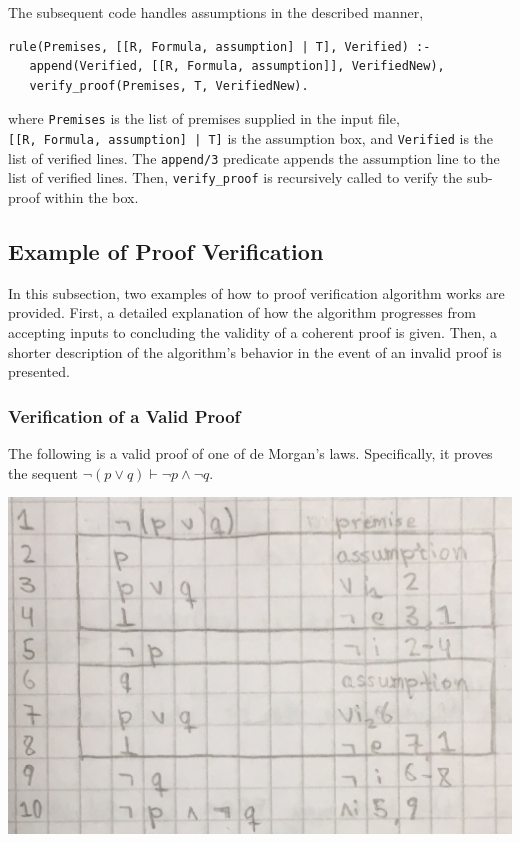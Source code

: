 \documentclass[a4paper, 11pt]{article}
\begin{document}
   The subsequent code handles assumptions in the described
   manner,

\begin{verbatim}
rule(Premises, [[R, Formula, assumption] | T], Verified) :-
   append(Verified, [[R, Formula, assumption]], VerifiedNew),
   verify_proof(Premises, T, VerifiedNew).
\end{verbatim}
   
   where \texttt{Premises} is the list of premises supplied 
   in the input file, \\ 
   \texttt{[[R, Formula, assumption] | T]} is the assumption
   box, and \texttt{Verified} is the list of verified lines.
   The \texttt{append/3} predicate appends the assumption line
   to the list of verified lines. Then, \texttt{verify\_proof}
   is recursively called to verify the sub-proof within the
   box.

   \subsection{Example of Proof Verification}

   In this subsection, two examples of how to proof
   verification algorithm works are provided. First, a
   detailed explanation of how the algorithm progresses from
   accepting inputs to concluding the validity of a coherent 
   proof is given. Then, a shorter description of the 
   algorithm's behavior in the event of an invalid proof is 
   presented.
   
   \subsubsection{Verification of a Valid Proof}

   The following is a valid proof of one of de Morgan's laws.
   Specifically, it proves the sequent 
   $\neg(p \vee q) \vdash \neg p \wedge \neg q$.
   \bigbreak

   \includegraphics[scale=0.25]{de-morgan-valid}
   
\end{document}
